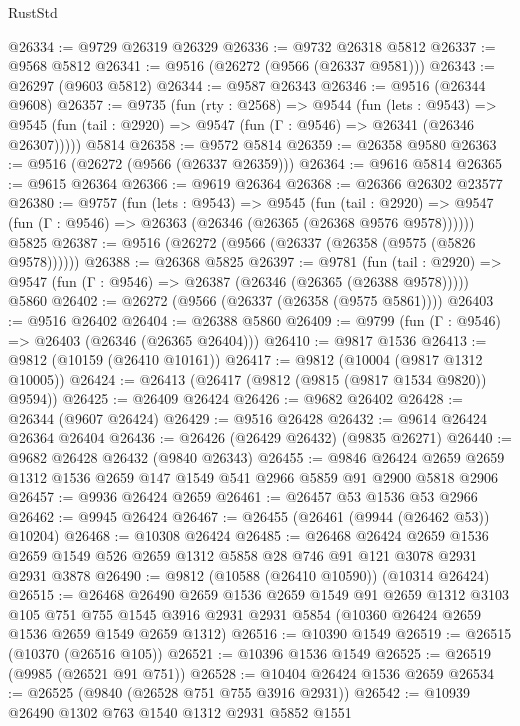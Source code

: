 \begin{lexlean}{RustStd}
\begin{coremodule}
@26334 := @9729 @26319 @26329
@26336 := @9732 @26318 @5812
@26337 := @9568 @5812
@26341 := @9516 (@26272 (@9566 (@26337 @9581)))
@26343 := @26297 (@9603 @5812)
@26344 := @9587 @26343
@26346 := @9516 (@26344 @9608)
@26357 := @9735
    (fun (rty : @2568) =>
    @9544
      (fun (lets : @9543) =>
      @9545 (fun (tail : @2920) => @9547 (fun (Γ : @9546) => @26341 (@26346 @26307)))))
    @5814
@26358 := @9572 @5814
@26359 := @26358 @9580
@26363 := @9516 (@26272 (@9566 (@26337 @26359)))
@26364 := @9616 @5814
@26365 := @9615 @26364
@26366 := @9619 @26364
@26368 := @26366 @26302 @23577
@26380 := @9757
    (fun (lets : @9543) =>
    @9545
      (fun (tail : @2920) =>
      @9547 (fun (Γ : @9546) => @26363 (@26346 (@26365 (@26368 @9576 @9578))))))
    @5825
@26387 := @9516 (@26272 (@9566 (@26337 (@26358 (@9575 (@5826 @9578))))))
@26388 := @26368 @5825
@26397 := @9781
    (fun (tail : @2920) => @9547 (fun (Γ : @9546) => @26387 (@26346 (@26365 (@26388 @9578)))))
    @5860
@26402 := @26272 (@9566 (@26337 (@26358 (@9575 @5861))))
@26403 := @9516 @26402
@26404 := @26388 @5860
@26409 := @9799 (fun (Γ : @9546) => @26403 (@26346 (@26365 @26404)))
@26410 := @9817 @1536
@26413 := @9812 (@10159 (@26410 @10161))
@26417 := @9812 (@10004 (@9817 @1312 @10005))
@26424 := @26413 (@26417 (@9812 (@9815 (@9817 @1534 @9820)) @9594))
@26425 := @26409 @26424
@26426 := @9682 @26402
@26428 := @26344 (@9607 @26424)
@26429 := @9516 @26428
@26432 := @9614 @26424 @26364 @26404
@26436 := @26426 (@26429 @26432) (@9835 @26271)
@26440 := @9682 @26428 @26432 (@9840 @26343)
@26455 := @9846
    @26424
    @2659
    @2659
    @1312
    @1536
    @2659
    @147
    @1549
    @541
    @2966
    @5859
    @91
    @2900
    @5818
    @2906
@26457 := @9936 @26424 @2659
@26461 := @26457 @53 @1536 @53 @2966
@26462 := @9945 @26424
@26467 := @26455 (@26461 (@9944 (@26462 @53)) @10204)
@26468 := @10308 @26424
@26485 := @26468
    @26424
    @2659
    @1536
    @2659
    @1549
    @526
    @2659
    @1312
    @5858
    @28
    @746
    @91
    @121
    @3078
    @2931
    @2931
    @3878
@26490 := @9812 (@10588 (@26410 @10590)) (@10314 @26424)
@26515 := @26468
    @26490
    @2659
    @1536
    @2659
    @1549
    @91
    @2659
    @1312
    @3103
    @105
    @751
    @755
    @1545
    @3916
    @2931
    @2931
    @5854
    (@10360 @26424 @2659 @1536 @2659 @1549 @2659 @1312)
@26516 := @10390 @1549
@26519 := @26515 (@10370 (@26516 @105))
@26521 := @10396 @1536 @1549
@26525 := @26519 (@9985 (@26521 @91 @751))
@26528 := @10404 @26424 @1536 @2659
@26534 := @26525 (@9840 (@26528 @751 @755 @3916 @2931))
@26542 := @10939 @26490 @1302 @763 @1540 @1312 @2931 @5852 @1551

\end{coremodule}
\end{lexlean}
